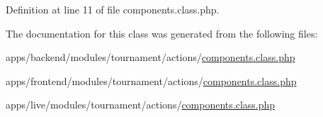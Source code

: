 Definition at line 11 of file components.\-class.\-php.



The documentation for this class was generated from the following files\-:\begin{DoxyCompactItemize}
\item 
apps/backend/modules/tournament/actions/\hyperlink{backend_2modules_2tournament_2actions_2components_8class_8php}{components.\-class.\-php}\item 
apps/frontend/modules/tournament/actions/\hyperlink{frontend_2modules_2tournament_2actions_2components_8class_8php}{components.\-class.\-php}\item 
apps/live/modules/tournament/actions/\hyperlink{live_2modules_2tournament_2actions_2components_8class_8php}{components.\-class.\-php}\end{DoxyCompactItemize}
